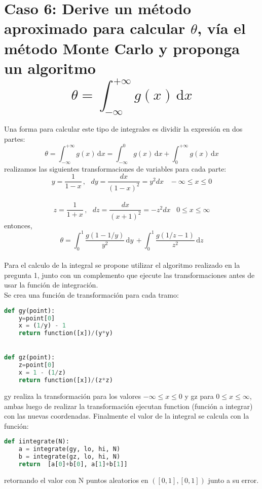 \documentclass[letter, 10pt]{article}
\begin{document}
\section{Caso 6: Derive un m\'etodo aproximado para calcular $\theta$, v\'ia el m\'etodo Monte Carlo y proponga un algoritmo
$$\theta = \int_{-\infty}^{+\infty} \! g(x) \, \mathrm{d} x $$}
Una forma para calcular este tipo de integrales es dividir la expresi\'on en dos partes:
$$\theta = \int_{-\infty}^{+\infty} \! g(x) \, \mathrm{d} x = \int_{-\infty}^{0} \! g(x) \, \mathrm{d} x + \int_{0}^{+\infty} \! g(x) \, \mathrm{d} x $$
realizamos las siguientes transformaciones de variables para cada parte:\\

$$y= \frac{1}{1-x} \,, \,\,\,\, dy= \frac{dx}{(1-x)^2} = y^{2}dx \,\,\,\,\,  -\infty \leq x \leq 0$$\\
$$z= \frac{1}{1+x} \,, \,\,\,\, dz= \frac{dx}{(x+1)^2} = -z^{2}dx \,\,\,\,\,  0 \leq x \leq \infty$$
entonces,
$$\theta = \int_0^1 \! \frac{g(1 - 1/y)}{y^2} \, \mathrm{d} y \, + \int_{0}^{1} \! \frac{g(1/z - 1)}{z^2} \, \mathrm{d} z $$
\\
Para el calculo de la integral se propone utilizar el algoritmo realizado en la pregunta 1, junto con un complemento que ejecute las transformaciones antes de usar la funci\'on de integraci\'on.\\
Se crea una funci\'on de transformaci\'on para cada tramo:
\begin{lstlisting}[language=Python]
 def gy(point):
    y=point[0]
    x = (1/y) - 1
    return function([x])/(y*y)


def gz(point):
    z=point[0]
    x = 1 - (1/z)
    return function([x])/(z*z)
\end{lstlisting}
gy realiza la transformaci\'on para los valores $-\infty \leq x \leq 0$ y gz para $0\leq x \leq \infty $, ambas luego de realizar la transformaci\'on ejecutan function (funci\'on a integrar) con las nuevas coordenadas. Finalmente el valor de la integral se calcula con la funci\'on:
\begin{lstlisting}[language=Python]
 def iintegrate(N):
    a = integrate(gy, lo, hi, N)
    b = integrate(gz, lo, hi, N)
    return  [a[0]+b[0], a[1]+b[1]]
\end{lstlisting}
retornando el valor con N puntos aleatorios en $([0,1],[0,1])$ junto a su error.
\end{document}
